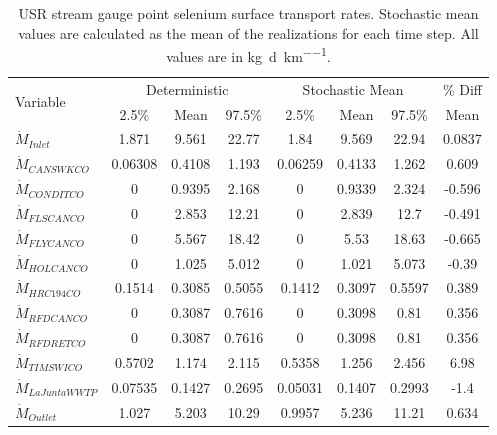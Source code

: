 \begin{linenumbers}
\begin{table}[htbp]
\centering
\caption[USR stream gauge point selenium surface transport rates.]{USR stream gauge point selenium surface transport rates.  Stochastic mean values are calculated as the mean of the realizations for each time step.  All values are in \si{\kilo\gram\per\day\per\kilo\meter}.}
\label{tab:USRGaugeSeFlow}
    \begin{tabular}{l|ccc|ccc|c}
    \toprule
    \multirow{2}[0]{*}{Variable} & \multicolumn{3}{c}{Deterministic} & \multicolumn{3}{c}{Stochastic Mean} & \% Diff\\\cline{2-4} \cline{5-7}
    & 2.5\% & Mean & 97.5\% & 2.5\% & Mean & 97.5\% & Mean\\
    \midrule
    \midrule
	$\dot{M}_{Inlet}$&	1.871	&9.561	&22.77	&1.84	&9.569	&22.94	&0.0837	\\
	$\dot{M}_{CANSWKCO}$&	0.06308	&0.4108	&1.193	&0.06259	&0.4133	&1.262	&0.609	\\
	$\dot{M}_{CONDITCO}$&	0	&0.9395	&2.168	&0	&0.9339	&2.324	&-0.596	\\
	$\dot{M}_{FLSCANCO}$&	0	&2.853	&12.21	&0	&2.839	&12.7	&-0.491	\\
	$\dot{M}_{FLYCANCO}$&	0	&5.567	&18.42	&0	&5.53	&18.63	&-0.665	\\
	$\dot{M}_{HOLCANCO}$&	0	&1.025	&5.012	&0	&1.021	&5.073	&-0.39	\\
	$\dot{M}_{HRC194CO}$&	0.1514	&0.3085	&0.5055	&0.1412	&0.3097	&0.5597	&0.389	\\
	$\dot{M}_{RFDCANCO}$&	0	&0.3087	&0.7616	&0	&0.3098	&0.81	&0.356	\\
	$\dot{M}_{RFDRETCO}$&	0	&0.3087	&0.7616	&0	&0.3098	&0.81	&0.356	\\
	$\dot{M}_{TIMSWICO}$&	0.5702	&1.174	&2.115	&0.5358	&1.256	&2.456	&6.98	\\
	$\dot{M}_{La Junta WWTP}$&	0.07535	&0.1427	&0.2695	&0.05031	&0.1407	&0.2993	&-1.4	\\
	$\dot{M}_{Outlet}$&	1.027	&5.203	&10.29	&0.9957	&5.236	&11.21	&0.634	\\
	\bottomrule
	\end{tabular}
\end{table}
	

\end{linenumbers}
